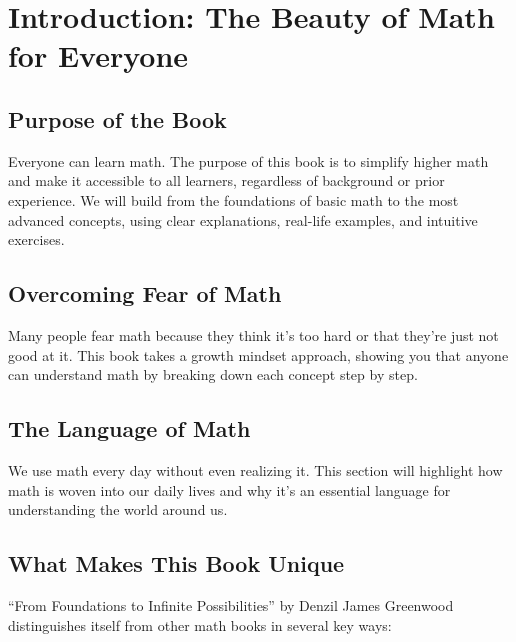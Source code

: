 \chapter{Introduction: The Beauty of Math for Everyone}
\section{Purpose of the Book}
Everyone can learn math. The purpose of this book is to simplify higher math and make it accessible to all learners, regardless of background or prior experience.
We will build from the foundations of basic math to the most advanced concepts, using clear explanations, real-life examples, and intuitive exercises.

\section{Overcoming Fear of Math}
Many people fear math because they think it's too hard or that they're just not good at it. This book takes a growth mindset approach, showing you that anyone can understand math by breaking down each concept step by step.

\section{The Language of Math}
We use math every day without even realizing it. This section will highlight how math is woven into our daily lives and why it's an essential language for understanding the world around us.

\section{What Makes This Book Unique}

``From Foundations to
Infinite Possibilities'' by Denzil James Greenwood distinguishes itself from other math books in several key ways:

